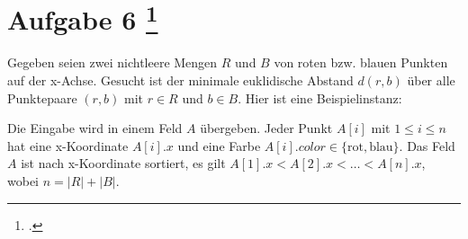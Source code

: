 \documentclass{lehramt-informatik-aufgabe}
\begin{document}
\section{Aufgabe 6
\footcite{46115:2020:03}}

Gegeben seien zwei nichtleere Mengen $R$ und $B$ von roten bzw. blauen
Punkten auf der x-Achse. Gesucht ist der minimale euklidische Abstand
$d(r, b)$ über alle Punktepaare $(r,b)$ mit $r \in R$ und $b \in B$.
Hier ist eine Beispielinstanz:

Die Eingabe wird in einem Feld $A$ übergeben. Jeder Punkt $A[i]$ mit $1
\leq i \leq n$ hat eine x-Koordinate $A[i].x$ und eine Farbe $A[i].color
\in \{ \text{rot}, \text{blau} \}$. Das Feld $A$ ist nach x-Koordinate
sortiert, \dh es gilt $A[1].x < A[2].x < \dots < A[n].x$, wobei $n = |R|
+ |B|$.
\end{document}
